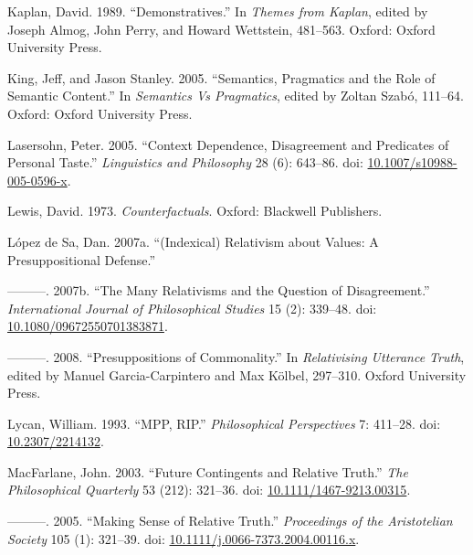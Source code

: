 \documentclass[
  11pt,
  letterpaper,
  DIV=11,
  numbers=noendperiod,
  twoside]{scrartcl}
\newlength{\cslhangindent}
\newenvironment{CSLReferences}[2] %
 {\begin{list}{}{%
  \setlength{\itemindent}{0pt}
  \setlength{\leftmargin}{0pt}
  \setlength{\parsep}{0pt}
  \ifodd #1
   \setlength{\leftmargin}{\cslhangindent}
   \setlength{\itemindent}{-1\cslhangindent}
  \fi
  \setlength{\itemsep}{#2\baselineskip}}}
 {\end{list}}
\begin{document}
\begin{CSLReferences}{1}{0}
Kaplan, David. 1989. {``Demonstratives.''} In \emph{Themes from Kaplan},
edited by Joseph Almog, John Perry, and Howard Wettstein, 481--563.
Oxford: Oxford University Press.

King, Jeff, and Jason Stanley. 2005. {``Semantics, Pragmatics and the
Role of Semantic Content.''} In \emph{Semantics Vs Pragmatics}, edited
by Zoltan Szabó, 111--64. Oxford: Oxford University Press.

Lasersohn, Peter. 2005. {``Context Dependence, Disagreement and
Predicates of Personal Taste.''} \emph{Linguistics and Philosophy} 28
(6): 643--86. doi:
\href{https://doi.org/10.1007/s10988-005-0596-x}{10.1007/s10988-005-0596-x}.

Lewis, David. 1973. \emph{Counterfactuals}. Oxford: Blackwell
Publishers.

López de Sa, Dan. 2007a. {``(Indexical) Relativism about Values: A
Presuppositional Defense.''}

---------. 2007b. {``The Many Relativisms and the Question of
Disagreement.''} \emph{International Journal of Philosophical Studies}
15 (2): 339--48. doi:
\href{https://doi.org/10.1080/09672550701383871}{10.1080/09672550701383871}.

---------. 2008. {``Presuppositions of Commonality.''} In
\emph{Relativising Utterance Truth}, edited by Manuel Garcia-Carpintero
and Max Kölbel, 297--310. Oxford University Press.

Lycan, William. 1993. {``MPP, RIP.''} \emph{Philosophical Perspectives}
7: 411--28. doi:
\href{https://doi.org/10.2307/2214132}{10.2307/2214132}.

MacFarlane, John. 2003. {``{Future Contingents and Relative Truth}.''}
\emph{The Philosophical Quarterly} 53 (212): 321--36. doi:
\href{https://doi.org/10.1111/1467-9213.00315}{10.1111/1467-9213.00315}.

---------. 2005. {``{Making Sense of Relative Truth}.''}
\emph{Proceedings of the Aristotelian Society} 105 (1): 321--39. doi:
\href{https://doi.org/10.1111/j.0066-7373.2004.00116.x}{10.1111/j.0066-7373.2004.00116.x}.


\end{CSLReferences}
\end{document}
